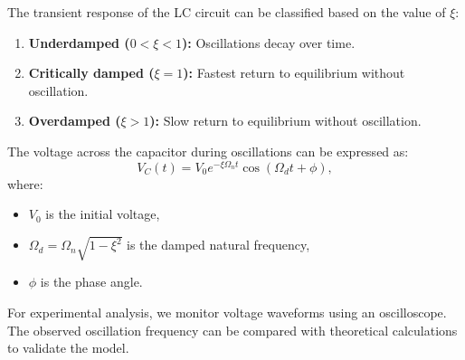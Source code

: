 \documentclass[journal]{IEEEtran}
\begin{document}
The transient response of the LC circuit can be classified based on the value of \(\xi\):
\begin{enumerate}
	\item \textbf{Underdamped (\(0 < \xi < 1\)):} Oscillations decay over time.
	\item \textbf{Critically damped (\(\xi = 1\)):} Fastest return to equilibrium without oscillation.
	\item \textbf{Overdamped (\(\xi > 1\)):} Slow return to equilibrium without oscillation.
\end{enumerate}

The voltage across the capacitor during oscillations can be expressed as:
\[
V_C(t) = V_0 e^{-\xi \Omega_n t} \cos(\Omega_d t + \phi),
\]
where:
\begin{itemize}
	\item \(V_0\) is the initial voltage,
	\item \(\Omega_d = \Omega_n \sqrt{1 - \xi^2}\) is the damped natural frequency,
	\item \(\phi\) is the phase angle.
\end{itemize}

\begin{figure}[!ht]
	\centering
	\label{fig:LC circuit with internal resistance}
	
\end{figure}


For experimental analysis, we monitor voltage waveforms using an oscilloscope. The observed oscillation frequency can be compared with theoretical calculations to validate the model.
\end{document}
